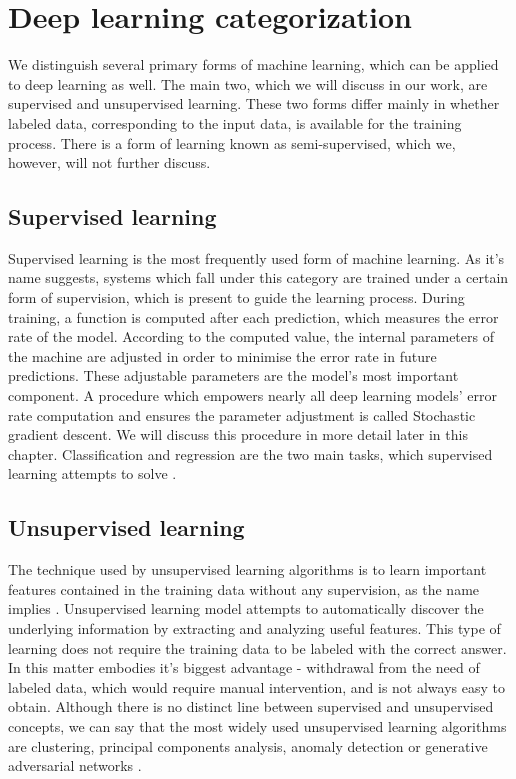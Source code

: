 \section{Deep learning categorization}
We distinguish several primary forms of machine learning, which can be applied to deep learning as well. The main two, which we will discuss in our work, are supervised and unsupervised learning.  \cite{lecundeeplearning} These two forms differ mainly in whether labeled data, corresponding to the input data, is available for the training process. There is a form of learning known as semi-supervised, which we, however, will not further discuss.

\subsection{Supervised learning}
Supervised learning  is the most frequently used form of machine learning. \cite{lecundeeplearning} As it's name suggests, systems which fall under this category are trained under a certain form of supervision, which is present to guide the learning process. During training, a function is computed after each prediction, which measures the error rate of the model. According to the computed value, the internal parameters of the machine are adjusted in order to minimise the error rate in future predictions. These adjustable parameters are the model's most important component. A procedure which empowers nearly all deep learning models' error rate computation and ensures the parameter adjustment is called Stochastic gradient descent. We will discuss this procedure in more detail later in this chapter. Classification and regression are the two main tasks, which supervised learning attempts to solve \cite{kim2019deep}.

\subsection{Unsupervised learning} The technique used by unsupervised learning algorithms is to learn important features contained in the training data without any supervision, as the name implies \cite{deeplearningbook}. Unsupervised learning model attempts to automatically discover the underlying information by extracting and analyzing useful features. This type of learning does not require the training data to be labeled with the correct answer. In this matter embodies it's biggest advantage - withdrawal from the need of labeled data, which would require manual intervention, and is not always easy to obtain. Although there is no distinct line between supervised and unsupervised concepts, we can say that the most widely used unsupervised learning algorithms are clustering, principal components analysis, anomaly detection or generative adversarial networks \cite{deeplearningbook, kim2019deep}.


